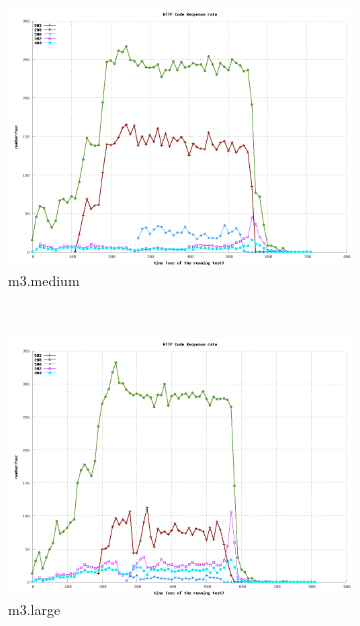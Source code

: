 \documentclass[dvips,12pt]{article}
\begin{document}
\begin{figure}[h!]
    \centering
    \begin{subfigure}[b]{0.3\textwidth}
        \includegraphics[width=\textwidth]{images/http_code_medium.png}
        \caption{m3.medium}
    \end{subfigure}
    ~ 
    \begin{subfigure}[b]{0.3\textwidth}
        \includegraphics[width=\textwidth]{images/http_code_large.png}
        \caption{m3.large}
    \end{subfigure}
    ~ 
    \begin{subfigure}[b]{0.3\textwidth}

\end{subfigure}
\end{figure}
\end{document}
